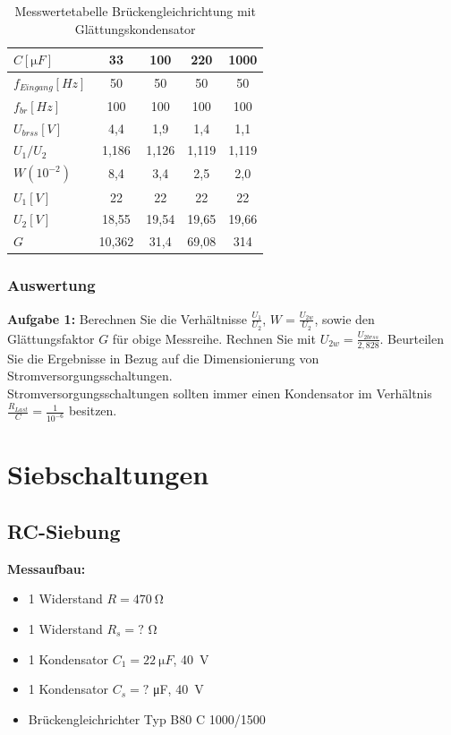 \documentclass[a4paper, 11pt,oneside]{article}
\begin{document}
	\begin{table}[H]
		\centering
		\caption{Messwertetabelle Brückengleichrichtung mit Glättungskondensator}
		\label{tab:mess_bruecke_mit_k_varianten}
		\begin{tabular}{l c c c c }
			\toprule
			$C [\si{\micro F}]$ & {33} & {100} & {220} & {1000} \\
			\midrule
			$f_{Eingang} [\si{Hz}]$ & 50 & 50 & 50 & 50 \\
			$f_{br} [\si{Hz}]$ & 100 & 100 & 100 & 100 \\
			$U_{brss} [\si{V}]$ & 4,4 & 1,9 & 1,4 & 1,1 \\
			$U_1/U_2$ & 1,186 & 1,126 & 1,119 & 1,119 \\
			$W (10^{-2})$ & 8,4 & 3,4 & 2,5 & 2,0 \\
			$U_1 [\si{V}]$ & 22 & 22 & 22 & 22 \\
			$U_2 [\si{V}]$ & 18,55 & 19,54 & 19,65 & 19,66 \\
			$G$ & 10,362 & 31,4 & 69,08 & 314 \\
			\bottomrule
		\end{tabular}
	\end{table}
	
	\subsubsection{Auswertung}
	
	\textbf{Aufgabe 1:} Berechnen Sie die Verhältnisse $\frac{U_1}{U_2}$, $W = \frac{U_{2w}}{U_2}$, sowie den Glättungsfaktor $G$ für obige Messreihe. Rechnen Sie mit $U_{2w} = \frac{U_{2brss}}{2,828}$. Beurteilen Sie die Ergebnisse in Bezug auf die Dimensionierung von Stromversorgungsschaltungen.\\
	
	Stromversorgungsschaltungen sollten immer einen Kondensator im Verhältnis $\frac{R_{Last}}{C} = \frac{1}{10^{-6}}$ besitzen.

	\section{Siebschaltungen}
	
	\subsection{RC-Siebung}
	
	\textbf{Messaufbau:}
	\begin{itemize}
		\item 1 Widerstand $R = \SI{470}{\ohm}$
		\item 1 Widerstand $R_s = ?$ \si{\ohm}
		\item 1 Kondensator $C_1 = \SI{22}{\micro F}$, \SI{40}{V}
		\item 1 Kondensator $C_s = ?$ \si{\micro F}, \SI{40}{V}
		\item Brückengleichrichter Typ B80 C 1000/1500
	\end{itemize}
	
\end{document}
